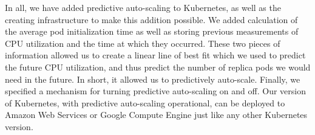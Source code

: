 In all, we have added predictive auto-scaling to Kubernetes, as well as the
creating infrastructure to make this addition possible. We added calculation of
the average pod initialization time as well as storing previous measurements of
CPU utilization and the time at which they occurred. These two pieces of
information allowed us to create a linear line of best fit which we used to
predict the future CPU utilization, and thus predict the number of replica pods
we would need in the future. In short, it allowed us to predictively auto-scale.
Finally, we specified a mechanism for turning predictive auto-scaling on and
off. Our version of Kubernetes, with predictive auto-scaling operational, can be
deployed to Amazon Web Services or Google Compute Engine just like any other Kubernetes
version.
